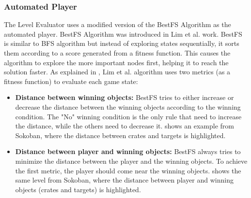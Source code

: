 \subsubsection{Automated Player}
The Level Evaluator uses a modified version of the BestFS Algorithm as the automated player. BestFS Algorithm was introduced in Lim et al.\cite{puzzleScriptGeneration} work. BestFS is similar to BFS algorithm but instead of exploring states sequentially, it sorts them according to a score generated from a fitness function. This causes the algorithm to explore the more important nodes first, helping it to reach the solution faster. As explained in , Lim et al. algorithm uses two metrics (as a fitness function) to evaluate each game state:
\begin{itemize} \itemsep0pt \parskip0pt 
	\item \textbf{Distance between winning objects:} BestFS tries to either increase or decrease the distance between the winning objects according to the winning condition. The "No" winning condition is the only rule that need to increase the distance, while the others need to decrease it.  shows an example from Sokoban, where the distance between crates and targets is highlighted.
	\item \textbf{Distance between player and winning objects:} BestFS always tries to minimize the distance between the player and the winning objects. To achieve the first metric, the player should come near the winning objects.  shows the same level from Sokoban, where the distance between player and winning objects (crates and targets) is highlighted.
\end{itemize}

